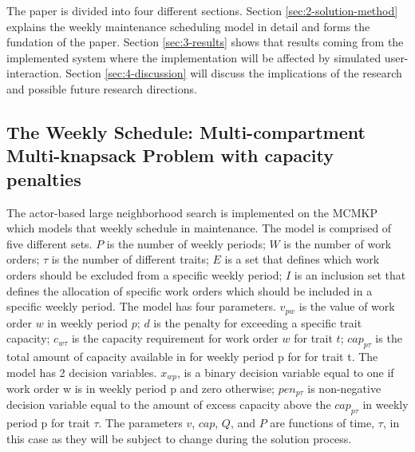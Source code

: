 \documentclass[preprint,12pt,authoryear]{elsarticle}
\begin{document}
The paper is divided into four different sections. Section \ref{sec:2-solution-method} explains the weekly maintenance scheduling model in detail and forms the fundation of the paper. 
Section \ref{sec:3-results} shows that results coming from the implemented system where the implementation will be affected by simulated user-interaction. Section \ref{sec:4-discussion} 
will discuss the implications of the research and possible future research directions.

\subsection{The Weekly Schedule: Multi-compartment Multi-knapsack Problem with capacity penalties}
\label{sub1sec2}
The actor-based large neighborhood search is implemented on the MCMKP which models that weekly schedule in maintenance. 
The model is comprised of 
five different sets. $P$ is the number of weekly periods; $W$ is the number of work orders; $\tau$ is the number of different traits; $E$ is a set that
defines which work orders should be excluded from a specific weekly period; $I$ is an inclusion set that defines the allocation of specific work orders 
which should be included in a specific weekly period. The model has four parameters. $v_{pw}$ is the value of work order $w$ in weekly period $p$; $d$ is the 
penalty for exceeding a specific trait capacity; $c_{w\tau}$ is the capacity requirement for work order $w$ for trait $t$; $cap_{p\tau}$ is the total amount 
of capacity available in for weekly period p for for trait t. The model has 2 decision variables. $x_{wp}$, is a binary decision variable equal to one 
if work order w is in weekly period p and zero otherwise; $pen_{p\tau}$ is non-negative decision variable equal to the amount of excess capacity above 
the $cap_{p\tau}$ in weekly period p for trait $\tau$. The parameters $v$, $cap$, $Q$, and $P$ are functions of time, $\tau$, in this case as they will be 
subject to change during the solution process.
\end{document}
